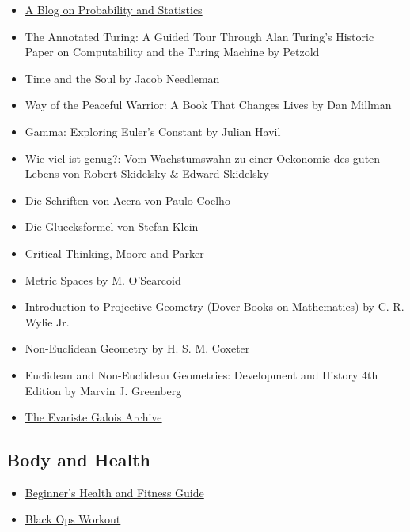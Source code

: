 \begin{itemize}
	\item \href{https://probabilityandstats.wordpress.com/}{A Blog on
  Probability and Statistics}

	\item The Annotated Turing: A Guided Tour Through Alan Turing's Historic
  Paper on Computability and the Turing Machine by Petzold

	\item Time and the Soul by Jacob Needleman

	\item Way of the Peaceful Warrior: A Book That Changes Lives by Dan Millman

	\item Gamma: Exploring Euler's Constant by Julian Havil

	\item Wie viel ist genug?: Vom Wachstumswahn zu einer Oekonomie des guten
  Lebens von Robert Skidelsky \& Edward Skidelsky

	\item Die Schriften von Accra von Paulo Coelho

	\item Die Gluecksformel von Stefan Klein

	\item Critical Thinking, Moore and Parker

	\item Metric Spaces by M. O'Searcoid

	\item Introduction to Projective Geometry (Dover Books on Mathematics) by C. R. Wylie Jr.

	\item Non-Euclidean Geometry by H. S. M. Coxeter

	\item Euclidean and Non-Euclidean Geometries: Development and History 4th Edition by Marvin J. Greenberg

	\item  \href{http://www.galois-group.net/g/EN/theory.html}{The Evariste Galois Archive}
\end{itemize}

\subsection{Body and Health}

\begin{itemize}
  \item \href{http://liamrosen.com/fitness.html}{Beginner's Health and Fitness Guide}

  \item \href{http://darebee.com/workouts/black-ops-workout.html}{Black Ops Workout}

\end{itemize}
